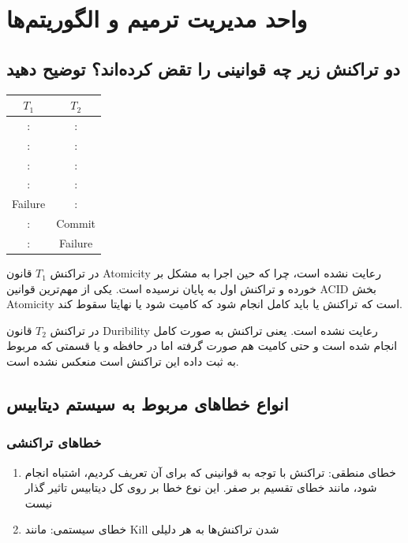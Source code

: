\section{واحد مدیریت ترمیم و الگوریتم‌ها}

\subsection*{دو تراکنش زیر چه قوانینی را تقض کرده‌اند؟ توضیح دهید}

\begin{LTR}
    \begin{table}[h]
        \begin{RTL}
        \end{RTL}
        \centering
            \begin{tabular}{c|c}
                $T_1$ & $T_2$ \\ \hline
                : & : \\
                : & : \\
                : & : \\
                : & : \\
                Failure & : \\
                : & Commit \\
                : & Failure
            \end{tabular}
    \end{table}
\end{LTR}

در تراکنش $T_1$ قانون Atomicity رعایت نشده است، چرا که حین اجرا به مشکل بر خورده
و تراکنش اول به پایان نرسیده است. یکی از مهم‌ترین قوانین ACID بخش Atomicity است
که تراکنش یا باید کامل انجام شود که کامیت شود یا نهایتا سقوط کند.

در تراکنش $T_2$ قانون Duribility رعایت نشده است. یعنی تراکنش به صورت کامل انجام
شده است و حتی کامیت هم صورت گرفته اما در حافظه و یا قسمتی که مربوط به ثبت داده
این تراکنش است منعکس نشده است.

\subsection{انواع خطا‌های مربوط به سیستم دیتابیس}

\subsubsection{خطا‌های تراکنشی}

\begin{enumerate}
    \item خطای منطقی: تراکنش با توجه به قوانینی که برای آن تعریف کردیم، اشتباه
    انجام شود، مانند خطای تقسیم بر صفر. این نوع خطا بر روی کل دیتابیس تاثیر گذار
    نیست
    \item خطای سیستمی: مانند Kill شدن تراکنش‌ها به هر دلیلی
\end{enumerate}

